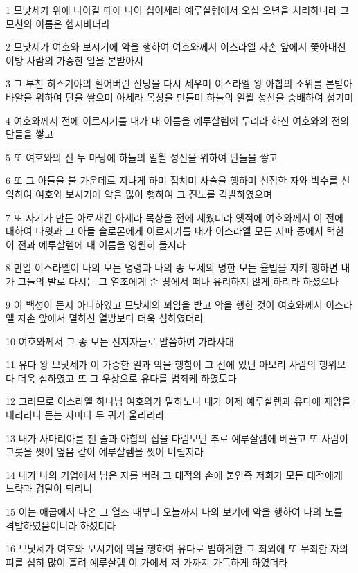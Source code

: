 \par 1 므낫세가 위에 나아갈 때에 나이 십이세라 예루살렘에서 오십 오년을 치리하니라 그 모친의 이름은 헵시바더라
\par 2 므낫세가 여호와 보시기에 악을 행하여 여호와께서 이스라엘 자손 앞에서 쫓아내신 이방 사람의 가증한 일을 본받아서
\par 3 그 부친 히스기야의 헐어버린 산당을 다시 세우며 이스라엘 왕 아합의 소위를 본받아 바알을 위하여 단을 쌓으며 아세라 목상을 만들며 하늘의 일월 성신을 숭배하여 섬기며
\par 4 여호와께서 전에 이르시기를 내가 내 이름을 예루살렘에 두리라 하신 여호와의 전의 단들을 쌓고
\par 5 또 여호와의 전 두 마당에 하늘의 일월 성신을 위하여 단들을 쌓고
\par 6 또 그 아들을 불 가운데로 지나게 하며 점치며 사술을 행하며 신접한 자와 박수를 신임하여 여호와 보시기에 악을 많이 행하여 그 진노를 격발하였으며
\par 7 또 자기가 만든 아로새긴 아세라 목상을 전에 세웠더라 옛적에 여호와께서 이 전에 대하여 다윗과 그 아들 솔로몬에게 이르시기를 내가 이스라엘 모든 지파 중에서 택한 이 전과 예루살렘에 내 이름을 영원히 둘지라
\par 8 만일 이스라엘이 나의 모든 명령과 나의 종 모세의 명한 모든 율법을 지켜 행하면 내가 그들의 발로 다시는 그 열조에게 준 땅에서 떠나 유리하지 않게 하리라 하셨으나
\par 9 이 백성이 듣지 아니하였고 므낫세의 꾀임을 받고 악을 행한 것이 여호와께서 이스라엘 자손 앞에서 멸하신 열방보다 더욱 심하였더라
\par 10 여호와께서 그 종 모든 선지자들로 말씀하여 가라사대
\par 11 유다 왕 므낫세가 이 가증한 일과 악을 행함이 그 전에 있던 아모리 사람의 행위보다 더욱 심하였고 또 그 우상으로 유다를 범죄케 하였도다
\par 12 그러므로 이스라엘 하나님 여호와가 말하노니 내가 이제 예루살렘과 유다에 재앙을 내리리니 듣는 자마다 두 귀가 울리리라
\par 13 내가 사마리아를 잰 줄과 아합의 집을 다림보던 추로 예루살렘에 베풀고 또 사람이 그릇을 씻어 엎음 같이 예루살렘을 씻어 버릴지라
\par 14 내가 나의 기업에서 남은 자를 버려 그 대적의 손에 붙인즉 저희가 모든 대적에게 노략과 겁탈이 되리니
\par 15 이는 애굽에서 나온 그 열조 때부터 오늘까지 나의 보기에 악을 행하여 나의 노를 격발하였음이니라 하셨더라
\par 16 므낫세가 여호와 보시기에 악을 행하여 유다로 범하게한 그 죄외에 또 무죄한 자의 피를 심히 많이 흘려 예루살렘 이 가에서 저 가까지 가득하게 하였더라

